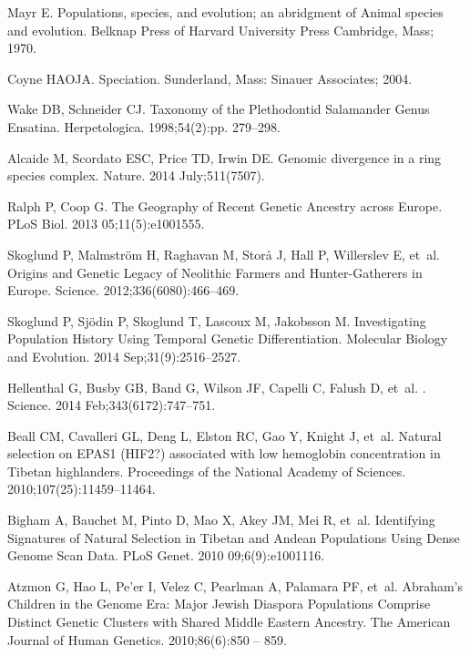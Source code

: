 \documentclass[10pt,letterpaper]{article}
\begin{document}
\begin{thebibliography}{80}
Mayr E.
\newblock Populations, species, and evolution; an abridgment of Animal species
  and evolution.
\newblock Belknap Press of Harvard University Press Cambridge, Mass; 1970.

Coyne HAOJA.
\newblock Speciation.
\newblock Sunderland, Mass: Sinauer Associates; 2004.

Wake DB, Schneider CJ.
\newblock Taxonomy of the Plethodontid Salamander Genus Ensatina.
\newblock Herpetologica. 1998;54(2):pp. 279--298.

Alcaide M, Scordato ESC, Price TD, Irwin DE.
\newblock Genomic divergence in a ring species complex.
\newblock Nature. 2014 July;511(7507).

Ralph P, Coop G.
\newblock The Geography of Recent Genetic Ancestry across {Europe}.
\newblock PLoS Biol. 2013 05;11(5):e1001555.

Skoglund P, Malmstr{\"o}m H, Raghavan M, Stor{\aa} J, Hall P, Willerslev E,
  et~al.
\newblock Origins and Genetic Legacy of Neolithic Farmers and Hunter-Gatherers
  in {Europe}.
\newblock Science. 2012;336(6080):466--469.

Skoglund P, Sjödin P, Skoglund T, Lascoux M, Jakobsson M.
\newblock Investigating Population History Using Temporal Genetic
  Differentiation.
\newblock Molecular Biology and Evolution. 2014 Sep;31(9):2516--2527.

Hellenthal G, Busby GB, Band G, Wilson JF, Capelli C, Falush D, et~al.
.
\newblock Science. 2014 Feb;343(6172):747--751.

Beall CM, Cavalleri GL, Deng L, Elston RC, Gao Y, Knight J, et~al.
\newblock Natural selection on {EPAS1} ({HIF2}?) associated with low hemoglobin
  concentration in {Tibetan} highlanders.
\newblock Proceedings of the National Academy of Sciences.
  2010;107(25):11459--11464.

Bigham A, Bauchet M, Pinto D, Mao X, Akey JM, Mei R, et~al.
\newblock Identifying Signatures of Natural Selection in {Tibetan} and {Andean}
  Populations Using Dense Genome Scan Data.
\newblock PLoS Genet. 2010 09;6(9):e1001116.

Atzmon G, Hao L, Pe'er I, Velez C, Pearlman A, Palamara PF, et~al.
\newblock Abraham's Children in the Genome Era: Major Jewish Diaspora
  Populations Comprise Distinct Genetic Clusters with Shared Middle Eastern
  Ancestry.
\newblock The American Journal of Human Genetics. 2010;86(6):850 -- 859.


\end{thebibliography}
\end{document}
